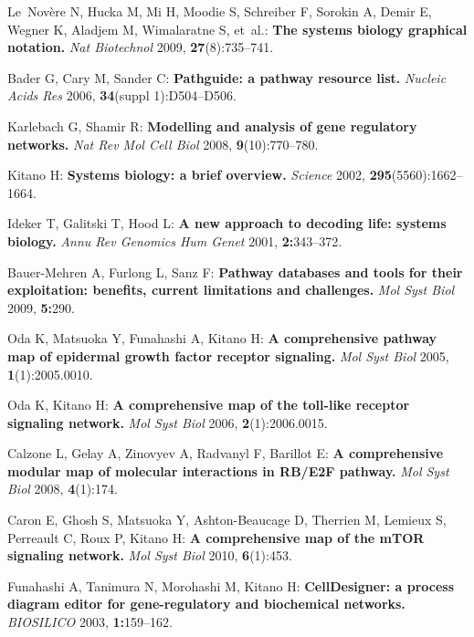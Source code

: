\documentclass[11pt]{bmc_article_s50}
\begin{document}
\begin{thebibliography}{10}
Le~Nov{\`e}re N, Hucka M, Mi H, Moodie S, Schreiber F, Sorokin A, Demir E,
  Wegner K, Aladjem M, Wimalaratne S, et~al.: \textbf{The systems biology
  graphical notation.} \emph{Nat Biotechnol} 2009,
  \textbf{27}(8):735--741.

Bader G, Cary M, Sander C: \textbf{Pathguide: a pathway resource list.}
  \emph{Nucleic Acids Res} 2006, \textbf{34}(suppl 1):D504--D506.

Karlebach G, Shamir R: \textbf{Modelling and analysis of gene regulatory
  networks.} \emph{Nat Rev Mol Cell Biol} 2008,
  \textbf{9}(10):770--780.

Kitano H: \textbf{Systems biology: a brief overview.} \emph{Science} 2002,
  \textbf{295}(5560):1662--1664.

Ideker T, Galitski T, Hood L: \textbf{A new approach to decoding life: systems
  biology.} \emph{Annu Rev Genomics Hum Genet} 2001,
  \textbf{2:}343--372.

Bauer-Mehren A, Furlong L, Sanz F: \textbf{Pathway databases and tools for
  their exploitation: benefits, current limitations and challenges.}
  \emph{Mol Syst Biol} 2009, \textbf{5:}{290}.

Oda K, Matsuoka Y, Funahashi A, Kitano H: \textbf{A comprehensive pathway map
  of epidermal growth factor receptor signaling.} \emph{Mol Syst Biol} 2005, \textbf{1}(1):2005.0010.

Oda K, Kitano H: \textbf{A comprehensive map of the toll-like receptor
  signaling network.} \emph{Mol Syst Biol} 2006, \textbf{2}(1):2006.0015.

Calzone L, Gelay A, Zinovyev A, Radvanyl F, Barillot E: \textbf{A comprehensive
  modular map of molecular interactions in RB/E2F pathway.} \emph{Mol Syst Biol} 2008, \textbf{4}(1):174.


Caron E, Ghosh S, Matsuoka Y, Ashton-Beaucage D, Therrien M, Lemieux S,
  Perreault C, Roux P, Kitano H: \textbf{A comprehensive map of the mTOR
  signaling network.} \emph{Mol Syst Biol} 2010, \textbf{6}(1):453.
 

Funahashi A, Tanimura N, Morohashi M, Kitano H: \textbf{CellDesigner: a process
  diagram editor for gene-regulatory and biochemical networks.} {\it BIOSILICO} 2003, \textbf{1:}{159--162}.


\end{thebibliography}
\end{document}
